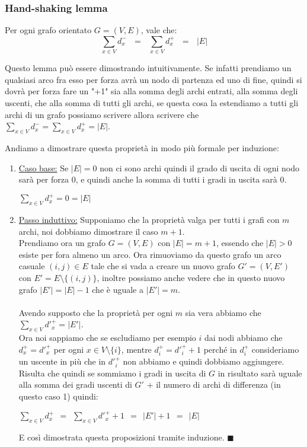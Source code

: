 \subsubsection{Hand-shaking lemma}
\begin{proposition}
Per ogni grafo orientato $G = (V,E)$, vale che:
\begin{equation}\label{hand-shaking-lemma}
    \sum\limits_{x \in V}d^-_x \: \: \: = \: \: \: \sum\limits_{x \in V}d^+_x \: \: \: = \: \: \: |E|
\end{equation}
\end{proposition}
Questo lemma può essere dimostrando intuitivamente. Se infatti prendiamo un qualsiasi arco fra esso per forza avrà un nodo di partenza ed uno di fine, quindi si dovrà per forza fare un "+1" sia alla somma degli archi entrati, alla somma degli uscenti, che alla somma di tutti gli archi, se questa cosa la estendiamo a tutti gli archi di un grafo possiamo scrivere allora scrivere che $\sum\limits_{x \in V}d^-_x = \sum\limits_{x \in V}d^+_x = |E|$.
\begin{demostration}
Andiamo a dimostrare questa proprietà in modo più formale per induzione:
\begin{enumerate}
    \item \underline{Caso base:} Se $|E| = 0$ non ci sono archi quindi il grado di uscita di ogni nodo sarà per forza 0, e quindi anche la somma di tutti i gradi in uscita sarà 0.
    \begin{center}
        $\sum\limits_{x \in V}d^+_x = 0 = |E|$
    \end{center}
    \item \underline{Passo induttivo:} Supponiamo che la proprietà valga per tutti i grafi con $m$ archi, noi dobbiamo dimostrare il caso $m+1$. \\
    Prendiamo ora un grafo $G = (V,E)$ con $|E| = m+1$, essendo che $|E| > 0$ esiste per fora almeno un arco. Ora rimuoviamo da questo grafo un arco casuale $(i,j) \in E$ tale che si vada a creare un nuovo grafo $G' = (V, E')$ con $E' = E \setminus \{(i,j)\}$, inoltre possiamo anche vedere che in questo nuovo grafo $|E'| = |E| - 1$ che è uguale a $|E'| = m$.\\\\
    Avendo supposto che la proprietà per ogni $m$ sia vera abbiamo che $\sum_{x\in V}d'^+_x = |E'|$. 
    \\Ora noi sappiamo che se escludiamo per esempio $i$ dai nodi abbiamo che $d^+_x = d'^+_x$ per ogni $x \in V \setminus \{ i \}$, mentre $d^+_i = d'^+_i + 1$ perché in $d^+_i$ consideriamo un uscente in più che in $d'^+_i$ non abbiamo e quindi dobbiamo aggiungere. Risulta che quindi se sommiamo i gradi in uscita di $G$ in risultato sarà uguale alla somma dei gradi uscenti di $G'$ + il numero di archi di differenza (in questo caso 1) quindi:
    \begin{center}
        $\sum\limits_{x \in V}d^+_x \: \: = \: \: \sum\limits_{x \in V}d'^+_x + 1 \: \: = \: \: |E'| + 1 \: \: = \: \: |E|$
    \end{center}
    E così dimostrata questa proposizioni tramite induzione. $\blacksquare$
\end{enumerate}
\end{demostration}

